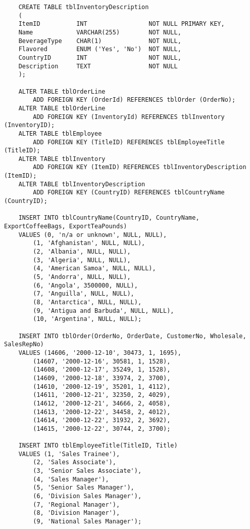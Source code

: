\documentclass[12pt,titlepage]{article}
\begin{document}
\begin{verbatim}
    CREATE TABLE tblInventoryDescription
    (
    ItemID          INT                 NOT NULL PRIMARY KEY,
    Name            VARCHAR(255)        NOT NULL,
    BeverageType    CHAR(1)             NOT NULL,
    Flavored        ENUM ('Yes', 'No')  NOT NULL,
    CountryID       INT                 NOT NULL,
    Description     TEXT                NOT NULL
    );

    ALTER TABLE tblOrderLine
        ADD FOREIGN KEY (OrderId) REFERENCES tblOrder (OrderNo);
    ALTER TABLE tblOrderLine
        ADD FOREIGN KEY (InventoryId) REFERENCES tblInventory (InventoryID);
    ALTER TABLE tblEmployee
        ADD FOREIGN KEY (TitleID) REFERENCES tblEmployeeTitle (TitleID);
    ALTER TABLE tblInventory
        ADD FOREIGN KEY (ItemID) REFERENCES tblInventoryDescription (ItemID);
    ALTER TABLE tblInventoryDescription
        ADD FOREIGN KEY (CountryID) REFERENCES tblCountryName (CountryID);

    INSERT INTO tblCountryName(CountryID, CountryName, ExportCoffeeBags, ExportTeaPounds)
    VALUES (0, 'n/a or unknown', NULL, NULL),
        (1, 'Afghanistan', NULL, NULL),
        (2, 'Albania', NULL, NULL),
        (3, 'Algeria', NULL, NULL),
        (4, 'American Samoa', NULL, NULL),
        (5, 'Andorra', NULL, NULL),
        (6, 'Angola', 3500000, NULL),
        (7, 'Anguilla', NULL, NULL),
        (8, 'Antarctica', NULL, NULL),
        (9, 'Antigua and Barbuda', NULL, NULL),
        (10, 'Argentina', NULL, NULL);

    INSERT INTO tblOrder(OrderNo, OrderDate, CustomerNo, Wholesale, SalesRepNo)
    VALUES (14606, '2000-12-10', 30473, 1, 1695),
        (14607, '2000-12-16', 30581, 1, 1528),
        (14608, '2000-12-17', 35249, 1, 1528),
        (14609, '2000-12-18', 33974, 2, 3700),
        (14610, '2000-12-19', 35201, 1, 4112),
        (14611, '2000-12-21', 32350, 2, 4029),
        (14612, '2000-12-21', 34666, 2, 4058),
        (14613, '2000-12-22', 34458, 2, 4012),
        (14614, '2000-12-22', 31932, 2, 3692),
        (14615, '2000-12-22', 30744, 2, 3700);

    INSERT INTO tblEmployeeTitle(TitleID, Title)
    VALUES (1, 'Sales Trainee'),
        (2, 'Sales Associate'),
        (3, 'Senior Sales Associate'),
        (4, 'Sales Manager'),
        (5, 'Senior Sales Manager'),
        (6, 'Division Sales Manager'),
        (7, 'Regional Manager'),
        (8, 'Division Manager'),
        (9, 'National Sales Manager');


\end{verbatim}
\end{document}
